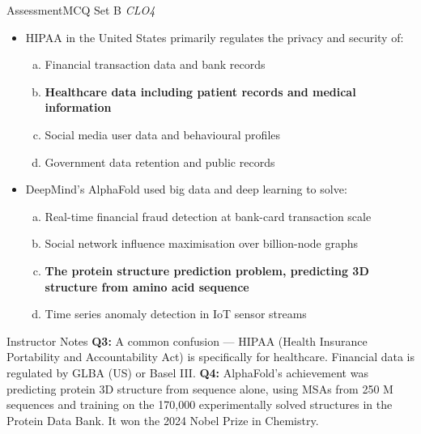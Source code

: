 \documentclass[aspectratio=169,10pt]{beamer}
\begin{document}
\begin{frame}{Assessment\textemdash MCQ Set B \hfill\small\textit{CLO4}}
  \vspace{6pt}
  \begin{itemize}
    \item[\textbf{Q3.}] HIPAA in the United States primarily regulates the privacy and security of:
    \begin{enumerate}[(a)]
      \item Financial transaction data and bank records
      \item \textbf{Healthcare data including patient records and medical information}
      \item Social media user data and behavioural profiles
      \item Government data retention and public records
    \end{enumerate}
  \end{itemize}
  \vspace{8pt}
  \begin{itemize}
    \item[\textbf{Q4.}] DeepMind's AlphaFold used big data and deep learning to solve:
    \begin{enumerate}[(a)]
      \item Real-time financial fraud detection at bank-card transaction scale
      \item Social network influence maximisation over billion-node graphs
      \item \textbf{The protein structure prediction problem, predicting 3D structure from amino acid sequence}
      \item Time series anomaly detection in IoT sensor streams
    \end{enumerate}
  \end{itemize}
  \vspace{6pt}
  \begin{alertblock}{Instructor Notes}
    \textbf{Q3:} A common confusion --- HIPAA (Health Insurance Portability and Accountability Act) is specifically for healthcare.  Financial data is regulated by GLBA (US) or Basel III.  \textbf{Q4:} AlphaFold's achievement was predicting protein 3D structure from sequence alone, using MSAs from 250 M sequences and training on the 170{,}000 experimentally solved structures in the Protein Data Bank.  It won the 2024 Nobel Prize in Chemistry.
  \end{alertblock}
\end{frame}
\end{document}
